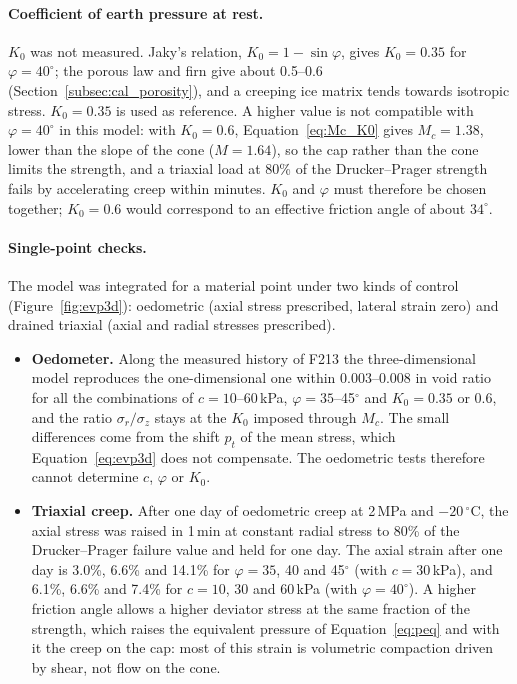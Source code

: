 \paragraph{Coefficient of earth pressure at rest.} $K_0$ was not measured. Jaky's relation, $K_0 = 1-\sin\varphi$, gives $K_0 = 0.35$ for $\varphi = 40^\circ$; the porous law and firn give about 0.5--0.6 (Section~\ref{subsec:cal_porosity}), and a creeping ice matrix tends towards isotropic stress. $K_0 = 0.35$ is used as reference. A higher value is not compatible with $\varphi = 40^\circ$ in this model: with $K_0 = 0.6$, Equation~\eqref{eq:Mc_K0} gives $M_c = 1.38$, lower than the slope of the cone ($M = 1.64$), so the cap rather than the cone limits the strength, and a triaxial load at 80\% of the Drucker--Prager strength fails by accelerating creep within minutes. $K_0$ and $\varphi$ must therefore be chosen together; $K_0 = 0.6$ would correspond to an effective friction angle of about $34^\circ$.

\paragraph{Single-point checks.} The model was integrated for a material point under two kinds of control (Figure~\ref{fig:evp3d}): oedometric (axial stress prescribed, lateral strain zero) and drained triaxial (axial and radial stresses prescribed).
\begin{itemize}
    \item \textbf{Oedometer.} Along the measured history of F213 the three-dimensional model reproduces the one-dimensional one within 0.003--0.008 in void ratio for all the combinations of $c = 10$--60\,kPa, $\varphi = 35$--45$^\circ$ and $K_0 = 0.35$ or 0.6, and the ratio $\sigma_r/\sigma_z$ stays at the $K_0$ imposed through $M_c$. The small differences come from the shift $p_t$ of the mean stress, which Equation~\eqref{eq:evp3d} does not compensate. The oedometric tests therefore cannot determine $c$, $\varphi$ or $K_0$.
    \item \textbf{Triaxial creep.} After one day of oedometric creep at 2\,MPa and $-20\,^\circ$C, the axial stress was raised in 1\,min at constant radial stress to 80\% of the Drucker--Prager failure value and held for one day. The axial strain after one day is 3.0\%, 6.6\% and 14.1\% for $\varphi = 35$, 40 and 45$^\circ$ (with $c = 30$\,kPa), and 6.1\%, 6.6\% and 7.4\% for $c = 10$, 30 and 60\,kPa (with $\varphi = 40^\circ$). A higher friction angle allows a higher deviator stress at the same fraction of the strength, which raises the equivalent pressure of Equation~\eqref{eq:peq} and with it the creep on the cap: most of this strain is volumetric compaction driven by shear, not flow on the cone.
\end{itemize}

